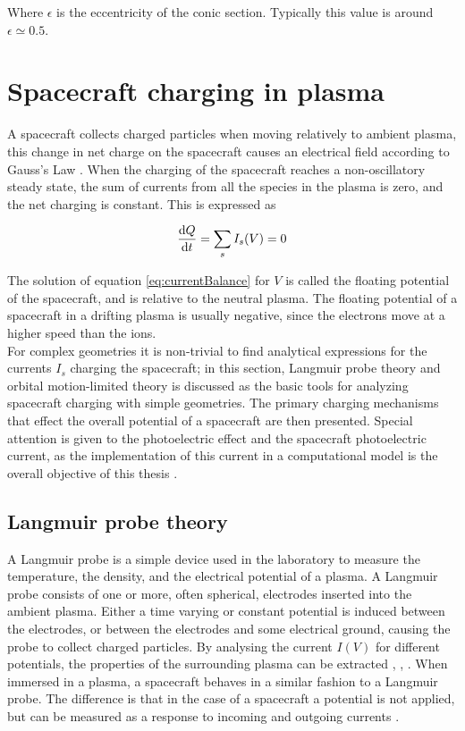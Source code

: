 Where $\epsilon$ is the eccentricity of the conic section. Typically this value is around $\epsilon \simeq 0.5$.

\section{Spacecraft charging in plasma}
A spacecraft collects charged particles when moving relatively to ambient plasma, this change in net charge on the spacecraft causes an electrical field according to Gauss's Law \parencite[Ch. 1]{LAI2019}. When the charging of the spacecraft reaches a non-oscillatory steady state, the sum of currents from all the species in the plasma is zero, and the net charging is constant. This is expressed as 

\begin{equation} \label{eq:currentBalance}
    \dv{Q}{t} = \sum_s I_s(V) = 0
\end{equation}

The solution of equation \eqref{eq:currentBalance} for $V$ is called the floating potential of the spacecraft, and is relative to the neutral plasma. The floating potential of a spacecraft in a drifting plasma is usually negative, since the electrons move at a higher speed than the ions.
\\
For complex geometries it is non-trivial to find analytical expressions for the currents $I_s$ charging the spacecraft; in this section, Langmuir probe theory and orbital motion-limited theory is discussed as the basic tools for analyzing spacecraft charging with simple geometries. The primary charging mechanisms that effect the overall potential of a spacecraft are then presented. Special attention is given to the photoelectric effect and the spacecraft photoelectric current, as the implementation of this current in a computational model is the overall objective of this thesis .


\subsection{Langmuir probe theory}
A Langmuir probe is a simple device used in the laboratory to measure the temperature, the density, and the electrical potential of a plasma. A Langmuir probe consists of one or more, often spherical, electrodes inserted into the ambient plasma. Either a time varying or constant potential is induced between the electrodes, or between the electrodes and some electrical ground, causing the probe to collect charged particles. By analysing the current $I(V)$ for different potentials, the properties of the surrounding plasma can be extracted  \parencite{Garrett1981}, \parencite{LAI2019}, \parencite{Miloch2012}. When immersed in a plasma, a spacecraft behaves in a similar fashion to a Langmuir probe. The difference is that in the case of a spacecraft a potential is not applied, but can be measured as a response to incoming and outgoing currents \parencite[Ch. 2]{LAI2019}. 


